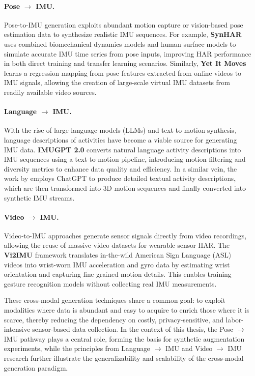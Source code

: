 \paragraph{Pose $\rightarrow$ IMU.}
Pose-to-IMU generation exploits abundant motion capture or vision-based pose estimation data to synthesize realistic IMU sequences. For example, \textbf{SynHAR} \cite{uhlenberg2024synhar} uses combined biomechanical dynamics models and human surface models to simulate accurate IMU time series from pose inputs, improving HAR performance in both direct training and transfer learning scenarios. Similarly, \textbf{Yet It Moves} \cite{rey2020yet} learns a regression mapping from pose features extracted from online videos to IMU signals, allowing the creation of large-scale virtual IMU datasets from readily available video sources.

\paragraph{Language $\rightarrow$ IMU.}
With the rise of large language models (LLMs) and text-to-motion synthesis, language descriptions of activities have become a viable source for generating IMU data. \textbf{IMUGPT 2.0} \cite{leng2024imugpt} converts natural language activity descriptions into IMU sequences using a text-to-motion pipeline, introducing motion filtering and diversity metrics to enhance data quality and efficiency. In a similar vein, the work by employs ChatGPT to produce detailed textual activity descriptions, which are then transformed into 3D motion sequences and finally converted into synthetic IMU streams.

\paragraph{Video $\rightarrow$ IMU.}
Video-to-IMU approaches generate sensor signals directly from video recordings, allowing the reuse of massive video datasets for wearable sensor HAR. The \textbf{Vi2IMU} framework \cite{santhalingam2023synthetic} translates in-the-wild American Sign Language (ASL) videos into wrist-worn IMU acceleration and gyro data by estimating wrist orientation and capturing fine-grained motion details. This enables training gesture recognition models without collecting real IMU measurements.

These cross-modal generation techniques share a common goal: to exploit modalities where data is abundant and easy to acquire to enrich those where it is scarce, thereby reducing the dependency on costly, privacy-sensitive, and labor-intensive sensor-based data collection. In the context of this thesis, the Pose $\rightarrow$ IMU pathway plays a central role, forming the basis for synthetic augmentation experiments, while the principles from Language $\rightarrow$ IMU and Video $\rightarrow$ IMU research further illustrate the generalizability and scalability of the cross-modal generation paradigm.

